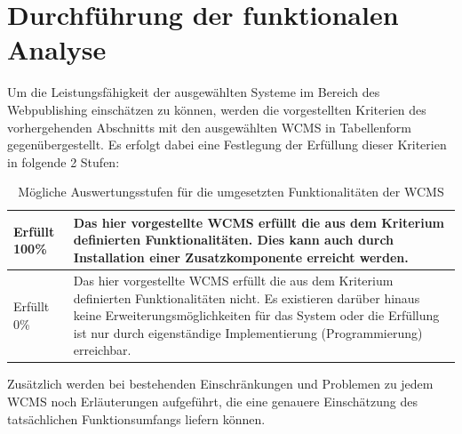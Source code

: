 \section{Durchführung der funktionalen Analyse}
\label{sec:durchanalyse}
Um die Leistungsfähigkeit der ausgewählten Systeme im Bereich des Webpublishing einschätzen zu können, werden die vorgestellten Kriterien des vorhergehenden Abschnitts mit den ausgewählten WCMS in Tabellenform gegenübergestellt. Es erfolgt dabei eine Festlegung der Erfüllung dieser Kriterien in folgende 2 Stufen:

\begin{table}[!h]
\renewcommand{\arraystretch}{1.5}
\center
\caption{Mögliche Auswertungsstufen für die umgesetzten Funktionalitäten der WCMS}
\begin{tabular}{|l|p{10cm}|}
\hline
\cellcolor{green} Erfüllt 100\% & Das hier vorgestellte WCMS erfüllt die aus dem
Kriterium definierten Funktionalitäten. Dies kann auch durch Installation einer Zusatzkomponente erreicht werden.\\
\hline
\cellcolor{red} Erfüllt 0\% & Das hier vorgestellte WCMS erfüllt die aus dem
Kriterium definierten Funktionalitäten nicht. Es existieren darüber hinaus keine Erweiterungsmöglichkeiten für das System oder die Erfüllung ist nur durch eigenständige Implementierung (Programmierung) erreichbar.\\
\hline
\end{tabular}
\end{table}
Zusätzlich werden bei bestehenden Einschränkungen und Problemen zu jedem WCMS noch Erläuterungen aufgeführt, die eine genauere Einschätzung des tatsächlichen Funktionsumfangs liefern können.
